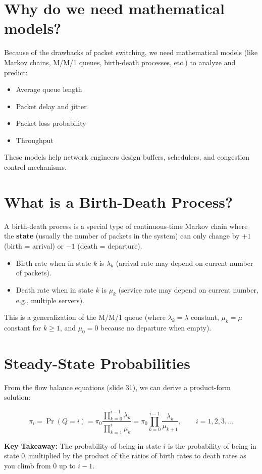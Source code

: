 \section*{Why do we need mathematical models?}

Because of the drawbacks of packet switching, we need mathematical models (like Markov chains, M/M/1 queues, birth-death processes, etc.) to analyze and predict:
\begin{itemize}
    \item Average queue length
    \item Packet delay and jitter
    \item Packet loss probability
    \item Throughput
\end{itemize}
These models help network engineers design buffers, schedulers, and congestion control mechanisms.


\section{What is a Birth-Death Process?}

A birth-death process is a special type of continuous-time Markov chain where the \textbf{state} (usually the number of packets in the system) can only change by \(+1\) (birth = arrival) or \(-1\) (death = departure).

\begin{itemize}
    \item Birth rate when in state \(k\) is \(\lambda_k\) (arrival rate may depend on current number of packets).
    \item Death rate when in state \(k\) is \(\mu_k\) (service rate may depend on current number, e.g., multiple servers).
\end{itemize}

This is a generalization of the M/M/1 queue (where \(\lambda_k = \lambda\) constant, \(\mu_k = \mu\) constant for \(k \ge 1\), and \(\mu_0 = 0\) because no departure when empty).

\section{Steady-State Probabilities}

From the flow balance equations (slide 31), we can derive a product-form solution:

\[
\pi_i = \Pr(Q = i) =\pi_0 \frac{\prod_{k=0}^{i-1} \lambda_k}{\prod_{k=1}^{i} \mu_k}= \pi_0 \prod_{k=0}^{i-1} \frac{\lambda_k}{\mu_{k+1}}, \qquad i = 1,2,3,\dots
\]
\begin{mdframed}[backgroundcolor=lightgray, linewidth=0pt, innertopmargin=8pt,
innerbottommargin=8pt]
\textbf{Key Takeaway:}
The probability of being in state \(i\) is the probability of being in state 0, multiplied by the product of the ratios of birth rates to death rates as you climb from 0 up to \(i-1\).
\end{mdframed}

